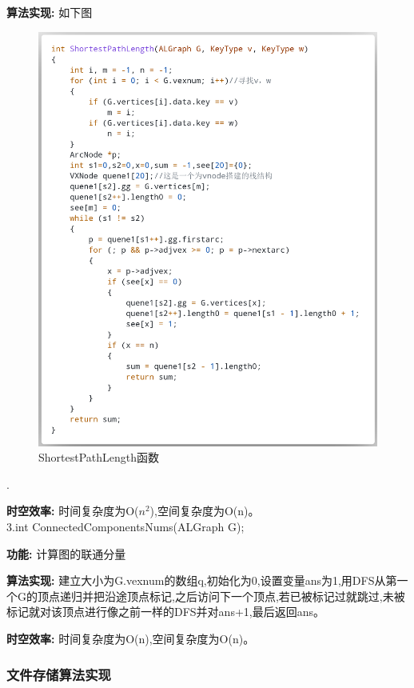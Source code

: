 \documentclass[supercite]{Experimental_Report}
\theoremstyle{definition}
\begin{document}
\textbf{算法实现: }如下图

\begin{figure}[htb]
	\begin{center}
		\includegraphics[scale=0.20]{images/2-1.png}
		\caption{ShortestPathLength函数}
		\label{fig2-1}
	\end{center}
\end{figure}.

\textbf{时空效率: }时间复杂度为O($n^{2}$),空间复杂度为O(n)。\\

3.int ConnectedComponentsNums(ALGraph G);

\textbf{功能: }计算图的联通分量

\textbf{算法实现: }建立大小为G.vexnum的数组q,初始化为0,设置变量ans为1,用DFS从第一个G的顶点递归并把沿途顶点标记,之后访问下一个顶点,若已被标记过就跳过,未被标记就对该顶点进行像之前一样的DFS并对ans+1,最后返回ans。

\textbf{时空效率: }时间复杂度为O(n),空间复杂度为O(n)。\\

\subsubsection{文件存储算法实现}
\end{document}
